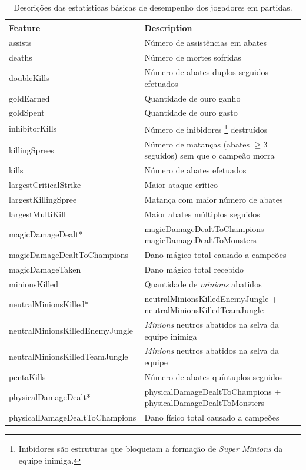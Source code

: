\begin{table}
  \scriptsize
  \caption{Descrições das estatísticas básicas de desempenho dos jogadores em partidas.}
  \label{tab:features-desc}
  \begin{tabular}{p{}p{}}
    \toprule
    Feature & Description \\
    \midrule
assists & Número de assistências em abates\\
deaths & Número de mortes sofridas \\
doubleKills & Número de abates duplos seguidos efetuados\\
goldEarned & Quantidade de ouro ganho\\
goldSpent & Quantidade de ouro gasto\\
inhibitorKills & Número de inibidores \footnote{Inibidores são estruturas que bloqueiam a formação de \textit{Super Minions} da equipe inimiga.} destruídos\\
killingSprees & Número de matanças (abates $\geq 3$ seguidos) sem que o campeão morra \\
kills & Número de abates efetuados\\
largestCriticalStrike & Maior ataque crítico\\
largestKillingSpree & Matança com maior número de abates\\
largestMultiKill & Maior abates múltiplos seguidos\\
magicDamageDealt* & magicDamageDealtToChampions +  magicDamageDealtToMonsters\\
magicDamageDealtToChampions & Dano mágico total causado a campeões\\
magicDamageTaken & Dano mágico total recebido\\
minionsKilled & Quantidade de \textit{minions} abatidos\\
 neutralMinionsKilled* & neutralMinionsKilledEnemyJungle + neutralMinionsKilledTeamJungle\\
neutralMinionsKilledEnemyJungle & \textit{Minions} neutros abatidos na selva da equipe inimiga
\\
neutralMinionsKilledTeamJungle & \textit{Minions} neutros abatidos na selva da equipe\\
pentaKills & Número de abates quíntuplos seguidos\\
physicalDamageDealt* & physicalDamageDealtToChampions + physicalDamageDealtToMonsters\\
physicalDamageDealtToChampions & Dano físico total causado a campeões\\

\end{tabular}
\end{table}

